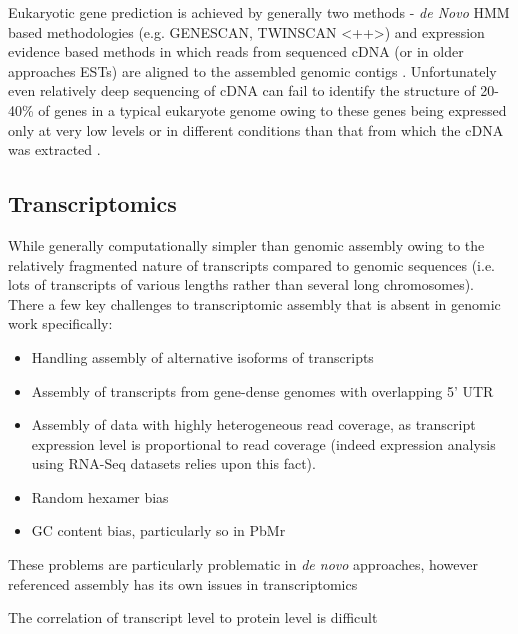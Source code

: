 Eukaryotic gene prediction is achieved by generally two methods - \textit{de Novo} HMM based
methodologies (e.g. GENESCAN, TWINSCAN \citep{}<++>) and expression evidence based methods
in which reads from sequenced cDNA (or in older approaches ESTs) are aligned to the 
assembled genomic contigs \citep{Brent2007}.  Unfortunately even relatively deep
sequencing of cDNA can fail to identify the structure of 20-40\% of genes in a typical
eukaryote genome owing to these genes being expressed only at very low levels or in
different conditions than that from which the cDNA was extracted \citep{Brent2007}.






\subsection{Transcriptomics}

While generally computationally simpler than genomic assembly \citep{MacManes2014}
owing to the relatively fragmented nature of transcripts compared to genomic 
sequences (i.e. lots of transcripts of various lengths rather than several 
long chromosomes).  There a few key challenges to transcriptomic assembly
that is absent in genomic work specifically:
\begin{itemize}
    \item Handling assembly of alternative isoforms of transcripts \citep{Pyrkosz2013}
    \item Assembly of transcripts from gene-dense genomes with overlapping 5' UTR 
    \item Assembly of data with highly heterogeneous read coverage, as transcript
        expression level is proportional to read coverage (indeed expression analysis
        using RNA-Seq datasets relies upon this fact).
    \item Random hexamer bias
    \item GC content bias, particularly so in PbMr
\end{itemize}

These problems are particularly problematic in \textit{de novo} approaches,
however referenced assembly has its own issues in transcriptomics






The correlation of transcript level to protein level is difficult





